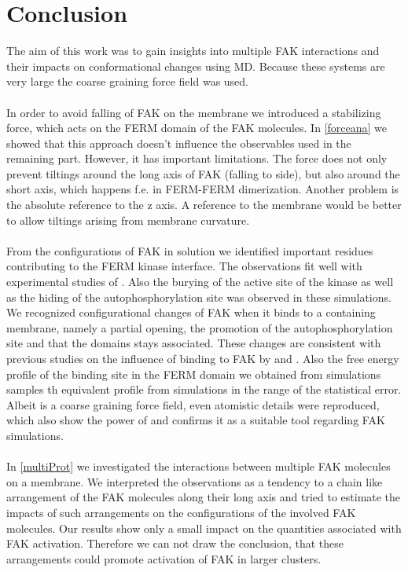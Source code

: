 \chapter{Conclusion}
The aim of this work was to gain insights into multiple FAK interactions and their impacts on conformational changes using MD. Because these systems are very large the coarse graining force field \martini{} was used.\\
\\
In order to avoid falling of FAK on the membrane we introduced a stabilizing force, which acts on the FERM domain of the FAK molecules. In \autoref{forceana} we showed that this approach doesn't influence the observables used in the remaining part. However, it has important limitations. The force does not only prevent tiltings around the long axis of FAK (falling to side), but also around the short axis, which happens f.e. in FERM-FERM dimerization. Another problem is the absolute reference to the z axis. A reference to the membrane would be better to allow tiltings arising from membrane curvature.\\ %
\\
From the configurations of FAK in solution we identified important residues contributing to the FERM kinase interface. The observations fit well with experimental studies of \textcite{structFAK}. Also the burying of the active site of the kinase as well as the hiding of the autophosphorylation site was observed in these simulations.\\
We recognized configurational changes of FAK when it binds to a \pip{} containing membrane, namely a partial opening, the promotion of the autophosphorylation site and that the domains stays associated. These changes are consistent with previous studies on the influence of \pip{} binding to FAK by \textcite{pap001} and \textcite{pap003}. Also the free energy profile of the \pip{} binding site in the FERM domain we obtained from \martini{} simulations samples th equivalent profile from \charmm{} simulations in the range of the statistical error.\\
Albeit \martini{} is a coarse graining force field, even atomistic details were reproduced, which also show the power of \martini{} and confirms it as a suitable tool regarding FAK simulations.\\
\\
In \autoref{multiProt} we investigated the interactions between multiple FAK molecules on a membrane. We interpreted the observations as a tendency to a chain like arrangement of the FAK molecules along their long axis and tried to estimate the impacts of such arrangements on the configurations of the involved FAK molecules. Our results show only a small impact on the quantities associated with FAK activation. Therefore we can not draw the conclusion, that these arrangements could promote activation of FAK in larger clusters.\\
